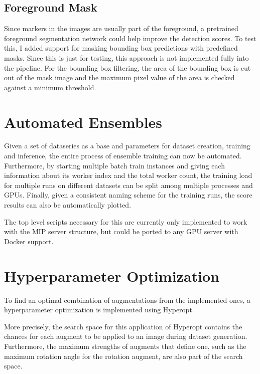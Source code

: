 \documentclass[10pt]{book}
\begin{document}
\subsection{Foreground Mask}

Since markers in the images are usually part of the foreground, a pretrained foreground segmentation network could help improve the detection scores.
To test this, I added support for masking bounding box predictions with predefined masks. Since this is just for testing, this approach is not implemented fully into the pipeline. For the bounding box filtering, the area of the bounding box is cut out of the mask image and the maximum pixel value of the area is checked against a minimum threshold. %


\section{Automated Ensembles}

Given a set of dataseries as a base and parameters for dataset creation, training and inference, the entire process of ensemble training can now be automated. Furthermore, by starting multiple batch train instances and giving each information about its worker index and the total worker count, the training load for multiple runs on different datasets can be split among multiple processes and \acp{GPU}. Finally, given a consistent naming scheme for the training runs, the score results can also be automatically plotted.

The top level scripts necessary for this are currently only implemented to work with the \ac{MIP} server structure, but could be ported to any \ac{GPU} server with Docker support.

\section{Hyperparameter Optimization}
\label{sec:hyper_opt}

To find an optimal combination of augmentations from the implemented ones, a hyperparameter optimization is implemented using Hyperopt. 

More precisely, the search space for this application of Hyperopt contains the chances for each augment to be applied to an image during dataset generation. Furthermore, the maximum strengths of augments that define one, such as the maximum rotation angle for the rotation augment, are also part of the search space. 
\end{document}
